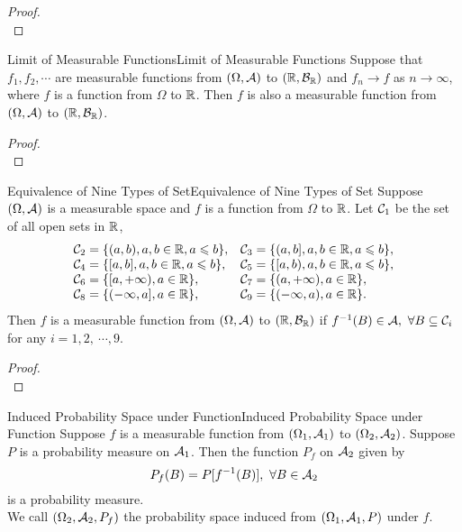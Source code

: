 \documentclass{elegantbook}
\begin{document}
\begin{proof}
\\[4cm]\vspace{0.01cm}
\end{proof}

\begin{theorem}{Limit of Measurable Functions}{Limit of Measurable Functions}
Suppose that $f_1,f_2,\cdots$ are measurable functions from $(\Omega,\mathcal{A})$ to $(\mathbb{R},\mathcal{B}_{\mathbb{R}})$ and $f_n\to f$ as $n\to\infty$, where $f$ is a function from $\Omega$ to $\mathbb{R}$. Then $f$ is also a measurable function from $(\Omega,\mathcal{A})$ to $(\mathbb{R},\mathcal{B}_{\mathbb{R}})$.
\end{theorem}

\begin{proof}
\\[4cm]\vspace{0.01cm}
\end{proof}

\begin{theorem}{Equivalence of Nine Types of Set}{Equivalence of Nine Types of Set}
Suppose $(\Omega,\mathcal{A})$ is a measurable space and $f$ is a function from $\Omega$ to $\mathbb{R}$. Let $\mathcal{C}_1$ be the set of all open sets in $\mathbb{R}$, 
$$
\begin{array}{ll}
\mathcal{C}_2=\{(a,b),a,b\in\mathbb{R},a\leqslant b\},    &\mathcal{C}_3=\{(a,b],a,b\in\mathbb{R},a\leqslant b\},\\
\mathcal{C}_4=\{[a,b],a,b\in\mathbb{R},a\leqslant b\},     &\mathcal{C}_5=\{[a,b),a,b\in\mathbb{R},a\leqslant b\},\\
\mathcal{C}_6=\{[a,+\infty),a\in\mathbb{R}\},        &\mathcal{C}_7=\{(a,+\infty),a\in\mathbb{R}\},\\
\mathcal{C}_8=\{(-\infty,a],a\in\mathbb{R}\},        &\mathcal{C}_9=\{(-\infty,a),a\in\mathbb{R}\}.\\
\end{array}
$$
Then $f$ is a measurable function from $(\Omega,\mathcal{A})$ to $(\mathbb{R},\mathcal{B}_{\mathbb{R}})$
if $f^{-1} (B)\in\mathcal{A},\ \forall B\subseteq\mathcal{C}_i$ for any $i=1,2,\ \cdots,9$.
\end{theorem}

\begin{proof}
\\[4cm]\vspace{0.01cm}
\end{proof}

\begin{theorem}{Induced Probability Space under Function}{Induced Probability Space under Function}
Suppose $f$ is a measurable function from $(\Omega_1,\mathcal{A}_1)$ to $(\Omega_2,\mathcal{A}_2)$. Suppose $P$ is a probability measure on $\mathcal{A}_1$.
Then the function $P_f$ on $\mathcal{A}_2$ given by $$P_f (B)=P[f^{-1} (B)],\  \forall B\in\mathcal{A}_2$$ is a probability measure.\\
We call $(\Omega_2,\mathcal{A}_2,P_f)$ the probability space induced from $(\Omega_1,\mathcal{A}_1,P)$ under $f$.
\end{theorem}
\end{document}
